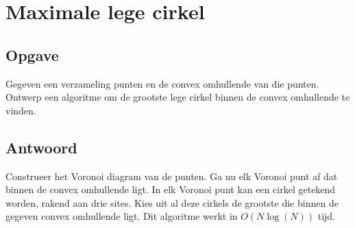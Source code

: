 \documentclass[examenvragen.tex]{subfiles}
\begin{document}
\section{Maximale lege cirkel}
\subsection{Opgave}
Gegeven een verzameling punten en de convex omhullende van die punten. Ontwerp een algoritme om de grootste lege cirkel binnen de convex omhullende te vinden.

\subsection{Antwoord}
Construeer het Voronoi diagram van de punten. Ga nu elk Voronoi punt af dat binnen de convex omhullende ligt. In elk Voronoi punt kan een cirkel getekend worden, rakend aan drie sites. Kies uit al deze cirkels de grootste die binnen de gegeven convex omhullende ligt. Dit algoritme werkt in $O(N\log(N))$ tijd.
\end{document}
